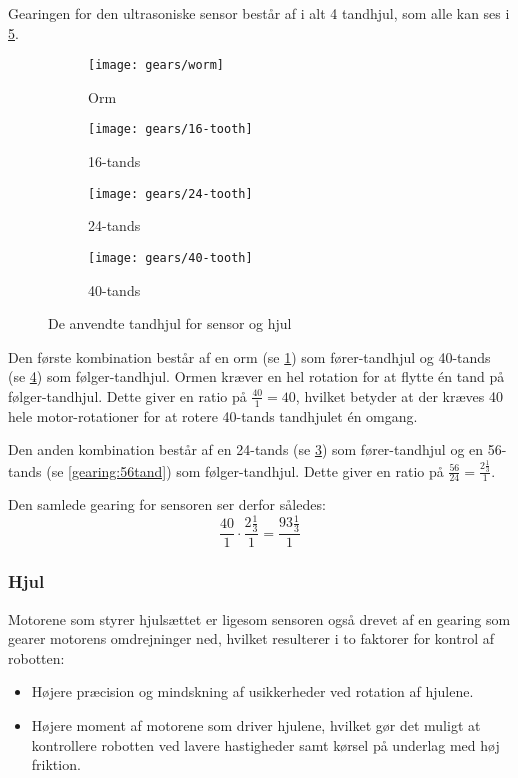 Gearingen for den ultrasoniske sensor består af i alt 4 tandhjul, som alle kan ses i \cref{gearing:tandhjul}.

\begin{figure}[h] %
\centering
\begin{subfigure}[b]{.19\textwidth}
\centering
\texttt{[image: gears/worm]}
\caption{Orm}
\label{gearing:orm}
\end{subfigure}
\begin{subfigure}[b]{.19\textwidth}
\centering
\texttt{[image: gears/16-tooth]}
\caption{16-tands}
\label{gearing:16tand}
\end{subfigure}
\begin{subfigure}[b]{.19\textwidth}
\centering
\texttt{[image: gears/24-tooth]}
\caption{24-tands}
\label{gearing:24tand}
\end{subfigure}
\begin{subfigure}[b]{.19\textwidth}
\centering
\texttt{[image: gears/40-tooth]}
\caption{40-tands}
\label{gearing:40tand}
\end{subfigure}
\caption{De anvendte tandhjul for sensor og hjul}
\label{gearing:tandhjul}
\end{figure}

Den første kombination består af en orm (se \cref{gearing:orm}) som fører-tandhjul og 40-tands (se \cref{gearing:40tand}) som følger-tandhjul.
Ormen kræver en hel rotation for at flytte én tand på følger-tandhjul.
Dette giver en ratio på $\frac{40}{1} = 40$, hvilket betyder at der kræves 40 hele motor-rotationer for at rotere 40-tands tandhjulet én omgang.

Den anden kombination består af en 24-tands (se \cref{gearing:24tand}) som fører-tandhjul og en 56-tands (se \cref{gearing:56tand}) som følger-tandhjul.
Dette giver en ratio på $\frac{56}{24} = \frac{2\frac{1}{3}}{1}$.

Den samlede gearing for sensoren ser derfor således: $$\frac{40}{1} \cdot \frac{2\frac{1}{3}}{1} = \frac{93 \frac{1}{3}}{1}$$

\subsubsection{Hjul}
Motorene som styrer hjulsættet er ligesom sensoren også drevet af en gearing som gearer motorens omdrejninger ned, hvilket resulterer i to faktorer for kontrol af robotten:

\begin{itemize}
\item Højere præcision og mindskning af usikkerheder ved rotation af hjulene.
\item Højere moment af motorene som driver hjulene, hvilket gør det muligt at kontrollere robotten ved lavere hastigheder samt kørsel på underlag med høj friktion.
\end{itemize}

